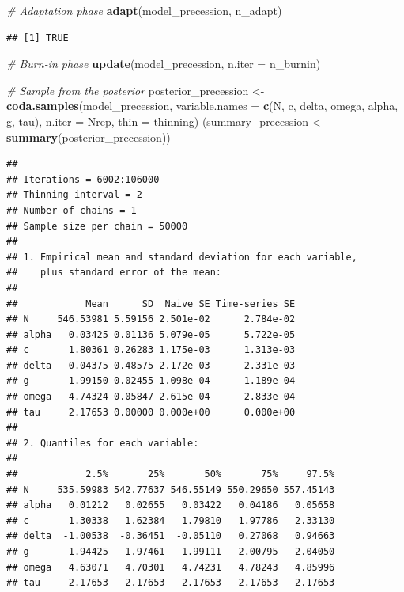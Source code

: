 \documentclass[
]{article}
\newenvironment{Shaded}{\begin{snugshade}}{\end{snugshade}}
\newcommand{\AttributeTok}[1]{\textcolor[rgb]{0.13,0.29,0.53}{#1}}
\newcommand{\CommentTok}[1]{\textcolor[rgb]{0.56,0.35,0.01}{\textit{#1}}}
\newcommand{\FunctionTok}[1]{\textcolor[rgb]{0.13,0.29,0.53}{\textbf{#1}}}
\newcommand{\NormalTok}[1]{#1}
\newcommand{\OtherTok}[1]{\textcolor[rgb]{0.56,0.35,0.01}{#1}}
\newcommand{\StringTok}[1]{\textcolor[rgb]{0.31,0.60,0.02}{#1}}
\begin{document}
\begin{Shaded}
\begin{Highlighting}[]
\CommentTok{\# Adaptation phase}
\FunctionTok{adapt}\NormalTok{(model\_precession, n\_adapt)}
\end{Highlighting}
\end{Shaded}

\begin{verbatim}
## [1] TRUE
\end{verbatim}

\begin{Shaded}
\begin{Highlighting}[]
\CommentTok{\# Burn{-}in phase}
\FunctionTok{update}\NormalTok{(model\_precession, }\AttributeTok{n.iter =}\NormalTok{ n\_burnin)}

\CommentTok{\# Sample from the posterior}
\NormalTok{posterior\_precession }\OtherTok{\textless{}{-}} \FunctionTok{coda.samples}\NormalTok{(model\_precession, }\AttributeTok{variable.names =} \FunctionTok{c}\NormalTok{(}\StringTok{\textquotesingle{}N\textquotesingle{}}\NormalTok{, }\StringTok{\textquotesingle{}c\textquotesingle{}}\NormalTok{, }\StringTok{\textquotesingle{}delta\textquotesingle{}}\NormalTok{, }\StringTok{\textquotesingle{}omega\textquotesingle{}}\NormalTok{, }\StringTok{\textquotesingle{}alpha\textquotesingle{}}\NormalTok{, }\StringTok{\textquotesingle{}g\textquotesingle{}}\NormalTok{, }\StringTok{\textquotesingle{}tau\textquotesingle{}}\NormalTok{), }\AttributeTok{n.iter =}\NormalTok{ Nrep, }\AttributeTok{thin =}\NormalTok{ thinning)}
\NormalTok{(summary\_precession }\OtherTok{\textless{}{-}} \FunctionTok{summary}\NormalTok{(posterior\_precession))}
\end{Highlighting}
\end{Shaded}

\begin{verbatim}
## 
## Iterations = 6002:106000
## Thinning interval = 2 
## Number of chains = 1 
## Sample size per chain = 50000 
## 
## 1. Empirical mean and standard deviation for each variable,
##    plus standard error of the mean:
## 
##            Mean      SD  Naive SE Time-series SE
## N     546.53981 5.59156 2.501e-02      2.784e-02
## alpha   0.03425 0.01136 5.079e-05      5.722e-05
## c       1.80361 0.26283 1.175e-03      1.313e-03
## delta  -0.04375 0.48575 2.172e-03      2.331e-03
## g       1.99150 0.02455 1.098e-04      1.189e-04
## omega   4.74324 0.05847 2.615e-04      2.833e-04
## tau     2.17653 0.00000 0.000e+00      0.000e+00
## 
## 2. Quantiles for each variable:
## 
##            2.5%       25%       50%       75%     97.5%
## N     535.59983 542.77637 546.55149 550.29650 557.45143
## alpha   0.01212   0.02655   0.03422   0.04186   0.05658
## c       1.30338   1.62384   1.79810   1.97786   2.33130
## delta  -1.00538  -0.36451  -0.05110   0.27068   0.94663
## g       1.94425   1.97461   1.99111   2.00795   2.04050
## omega   4.63071   4.70301   4.74231   4.78243   4.85996
## tau     2.17653   2.17653   2.17653   2.17653   2.17653
\end{verbatim}
\end{document}
